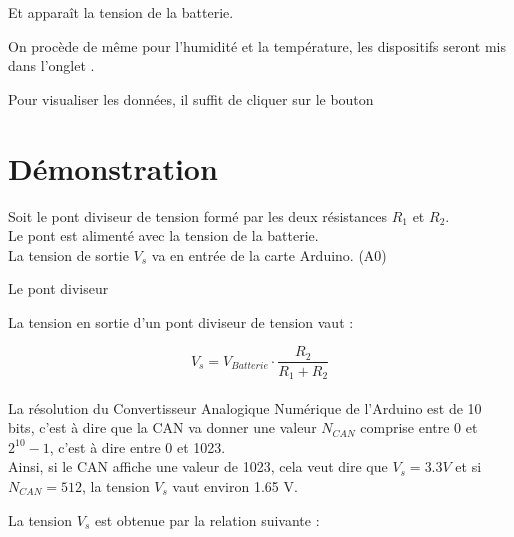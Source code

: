 
Et apparaît la tension de la batterie.


On procède de même pour l'humidité et la température, les dispositifs seront mis dans l'onglet  .



Pour visualiser les données, il suffit de cliquer sur le bouton %


\section{Démonstration}

Soit le pont diviseur de tension formé par les deux résistances $R_1$ et $R_2$.\\
Le pont est alimenté avec la tension de la batterie.\\
La tension de sortie $V_s$ va en entrée de la carte Arduino. (A0)


\begin{schema}{Le pont diviseur}
 \end{schema}


La tension en sortie d'un pont diviseur de tension vaut :

 $$ V_s = V_{Batterie} \cdot \frac{R_2}{R_1+R_2} $$\\

 La résolution du Convertisseur Analogique Numérique de l'Arduino est de 10 bits, c'est à dire que la CAN va donner une valeur $N_{CAN}$ comprise entre 0 et $2^{10}-1$, c'est à dire entre 0 et 1023.\\

 Ainsi, si le CAN affiche une valeur de 1023, cela veut dire que $V_s=3.3V$ et si $N_{CAN}=512$, la tension $V_s$ vaut environ 1.65 V.


 La tension $V_s$ est obtenue par la relation suivante : 


